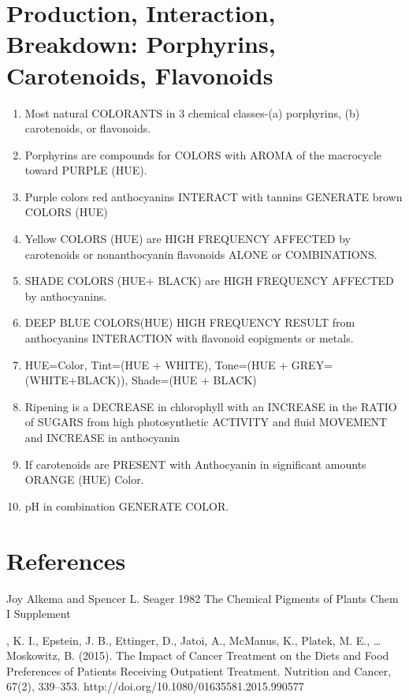 \documentclass{recipecard}
\begin{document}

\section{Production, Interaction, Breakdown: Porphyrins, Carotenoids, Flavonoids} 

\begin{enumerate}
\item Most natural COLORANTS in 3 chemical classes-(a) porphyrins, (b) carotenoids, or flavonoids. \cite{key1}	
\item Porphyrins are compounds for COLORS with AROMA of the macrocycle toward PURPLE (HUE).  \cite{key1}
\item Purple colors red anthocyanins INTERACT with tannins GENERATE brown COLORS (HUE)  \cite{key1}
\item Yellow COLORS (HUE) are HIGH FREQUENCY AFFECTED by carotenoids or nonanthocyanin flavonoids ALONE or COMBINATIONS. \cite{key1}
\item SHADE COLORS (HUE+ BLACK) are HIGH FREQUENCY AFFECTED by anthocyanins. \cite{key1}
\item DEEP BLUE COLORS(HUE) HIGH FREQUENCY RESULT from anthocyanins INTERACTION with flavonoid eopigments or metals. \cite{key1}
\item HUE=Color, Tint=(HUE + WHITE), Tone=(HUE + GREY=(WHITE+BLACK)), Shade=(HUE + BLACK)
\item Ripening is a DECREASE in chlorophyll with an INCREASE in the RATIO of SUGARS from high photosynthetic ACTIVITY and fluid MOVEMENT and INCREASE in anthocyanin  \cite{key1}
\item If carotenoids are PRESENT with Anthocyanin in significant amounts ORANGE (HUE) Color.  \cite{key1}
\item pH in combination GENERATE COLOR.  \cite{key1}
\end{enumerate}

\section{References}

Joy Alkema and Spencer L. Seager 1982
\newblock The Chemical Pigments of Plants 
\newblock Chem I Supplement

, K. I., Epstein, J. B., Ettinger, D., Jatoi, A., McManus, K., Platek, M. E., … Moskowitz, B. (2015). 
\newblock The Impact of Cancer Treatment on the Diets and Food Preferences of Patients Receiving Outpatient Treatment. 
\newblock Nutrition and Cancer, 67(2), 339–353. http://doi.org/10.1080/01635581.2015.990577
\end{document}
